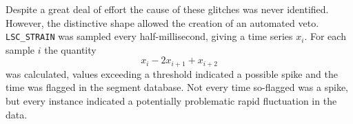 Despite a great deal of effort the cause of these glitches was never
identified.  However, the distinctive shape allowed the creation of an
automated veto.  \texttt{LSC\_STRAIN} was sampled every
half-millisecond, giving a time series $x_i$.  For each sample $i$ the
quantity 
%
\begin{equation*}
x_i - 2 x_{i+1} + x_{i+2} 
\end{equation*}
%
was calculated, values exceeding a threshold indicated a possible
spike and the time was flagged in the segment database.  Not every
time so-flagged was a spike, but every instance indicated a
potentially problematic rapid fluctuation in the data.







